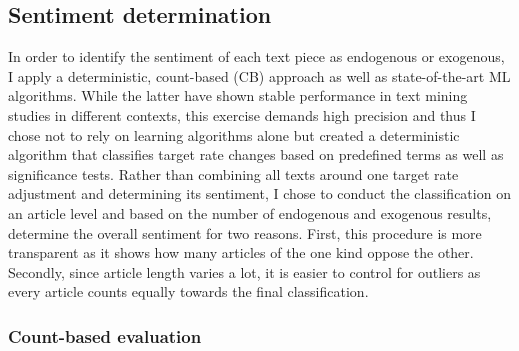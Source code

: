 

%
\subsection{Sentiment determination}

In order to identify the sentiment of each text piece as endogenous or exogenous, I apply a deterministic, count-based (CB) approach as well as state-of-the-art ML algorithms. While the latter have shown stable performance in text mining studies in different contexts, this exercise demands high precision and thus I chose not to rely on learning algorithms alone but created a deterministic algorithm that classifies target rate changes based on predefined terms as well as significance tests. Rather than combining all texts around one target rate adjustment and determining its sentiment, I chose to conduct the classification on an article level and based on the number of endogenous and exogenous results, determine the overall sentiment for two reasons. First, this procedure is more transparent as it shows how many articles of the one kind oppose the other. Secondly, since article length varies a lot, it is easier to control for outliers as every article counts equally towards the final classification. 

%
\subsubsection{Count-based evaluation}

